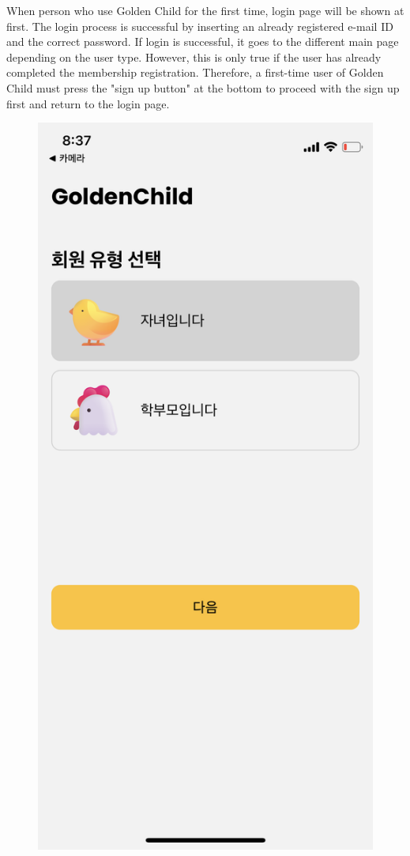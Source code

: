 \documentclass[conference]{IEEEtran}
\begin{document}
When person who use Golden Child for the first time, login page will be shown at first. The login process is successful by inserting an already registered e-mail ID and the correct password. If login is successful, it goes to the different main page depending on the user type. However, this is only true if the user has already completed the membership registration. Therefore, a first-time user of Golden Child must press the "sign up button" at the bottom to proceed with the sign up first and return to the login page.
\begin{figure}[H]
\centering
\includegraphics[scale=0.1]{UseCases/3.siginup.png}

\end{figure}
\end{document}
